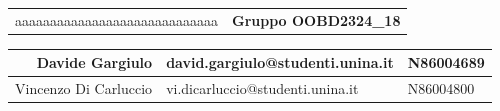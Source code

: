 


\thispagestyle{empty}

\color{white}
\pagecolor{pantoneRed}
\afterpage{\pagecolor{white}\nopagecolor}

\begin{center}
    \rule{0pt}{2cm}
    \begin{tabular}{lr}
        \color{pantoneRed} aaaaaaaaaaaaaaaaaaaaaaaaaaaaa & \Large \color{white}\textbf{Gruppo OOBD2324\_18}\\
    \end{tabular}
    \newline
    \begin{tabular}{r|l|l}
        \large Davide Gargiulo & \large david.gargiulo@studenti.unina.it & \large N86004689   \\\hline
        \large Vincenzo Di Carluccio & \large vi.dicarluccio@studenti.unina.it & \large N86004800 \\
    \end{tabular}
\end{center}

